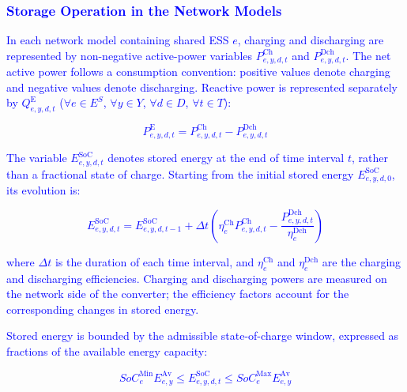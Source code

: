 \documentclass[preprint,12pt]{elsarticle}
\begin{document}
\subsubsection{\textcolor{blue}{Storage Operation in the Network Models}}
\label{subsubsec:network_storage}

\textcolor{blue}{
    In each network model containing shared ESS $e$, charging and discharging are represented by non-negative active-power variables $P^{\text{Ch}}_{e,y,d,t}$ and $P^{\text{Dch}}_{e,y,d,t}$.
    The net active power follows a consumption convention: positive values denote charging and negative values denote discharging. Reactive power is represented separately by $Q^{\text{E}}_{e,y,d,t}$ ($\forall e\in E^S$, $\forall y\in Y$, $\forall d\in D$, $\forall t\in T$):
}

\textcolor{blue}{
    \begin{equation}
        P^{\text{E}}_{e,y,d,t}
        =
        P^{\text{Ch}}_{e,y,d,t}
        -
        P^{\text{Dch}}_{e,y,d,t}
        \label{eq:storage_net_active_power}
    \end{equation}
}

\textcolor{blue}{
    The variable $E^{\text{SoC}}_{e,y,d,t}$ denotes stored energy at the end of time interval $t$, rather than a fractional state of charge. Starting from the initial stored energy $E^{\text{SoC}}_{e,y,d,0}$, its evolution is:
}

\textcolor{blue}{
    \begin{equation}
        E^{\text{SoC}}_{e,y,d,t} = E^{\text{SoC}}_{e,y,d,t-1}
        + \Delta t \left( \eta^{\text{Ch}}_e P^{\text{Ch}}_{e,y,d,t} - \frac{P^{\text{Dch}}_{e,y,d,t}}{\eta^{\text{Dch}}_e} \right)
        \label{eq:soc_recursion}
    \end{equation}
}

\noindent
\textcolor{blue}{
    where $\Delta t$ is the duration of each time interval, and $\eta^{\text{Ch}}_e$ and $\eta^{\text{Dch}}_e$ are the charging and discharging efficiencies. Charging and discharging powers are measured on the network side of the converter; the efficiency factors account for the corresponding changes in stored energy.
}

\textcolor{blue}{
    Stored energy is bounded by the admissible state-of-charge window, expressed as fractions of the available energy capacity:
}

\textcolor{blue}{
    \begin{equation}
        SoC^{\text{Min}}_e E^{\text{Av}}_{e,y}
        \le E^{\text{SoC}}_{e,y,d,t}
        \le SoC^{\text{Max}}_e E^{\text{Av}}_{e,y}
        \label{eq:soc_limits}
    \end{equation}
}
\end{document}
